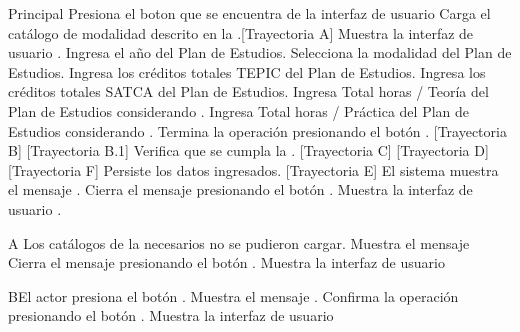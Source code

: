 \begin{UCtrayectoria}{Principal}
    \UCpaso[\UCactor] Presiona el boton \IUbutton{+} que se encuentra de la interfaz de usuario 
    \UCpaso Carga el catálogo de modalidad descrito en la .[Trayectoria A]
    \UCpaso Muestra la interfaz de usuario .
    \UCpaso[\UCactor] Ingresa el año del Plan de Estudios.
    \UCpaso[\UCactor] Selecciona la modalidad del Plan de Estudios.
    \UCpaso[\UCactor] Ingresa los créditos totales TEPIC del Plan de Estudios.
    \UCpaso[\UCactor] Ingresa los créditos totales SATCA del Plan de Estudios.
    \UCpaso[\UCactor] Ingresa Total horas / Teoría del Plan de Estudios considerando .
    \UCpaso[\UCactor] Ingresa Total horas / Práctica del Plan de Estudios  considerando .
    \UCpaso[\UCactor] Termina la operación presionando el botón . [Trayectoria B] [Trayectoria B.1]
    \UCpaso Verifica que se cumpla la . [Trayectoria C] [Trayectoria D] [Trayectoria F]
    \UCpaso Persiste los datos ingresados. [Trayectoria E]
    \UCpaso El sistema muestra el mensaje .
    \UCpaso[\UCactor] Cierra el mensaje presionando el botón .
    \UCpaso Muestra la interfaz de usuario .
\end{UCtrayectoria}
\begin{UCtrayectoriaA}{A}{ Los catálogos de la  necesarios no se pudieron cargar.}
	\UCpaso Muestra el mensaje 
	\UCpaso[\UCactor] Cierra el mensaje presionando el botón .
	\UCpaso Muestra la interfaz de usuario 
\end{UCtrayectoriaA}

\begin{UCtrayectoriaA}{B}{El actor presiona el botón .}
	\UCpaso Muestra el mensaje .
	\UCpaso[\UCactor] Confirma la operación presionando el botón .
	\UCpaso Muestra la interfaz de usuario 
\end{UCtrayectoriaA}

